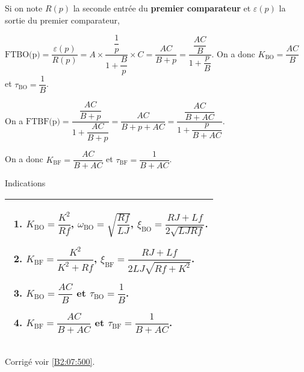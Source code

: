 \ifprof
Si on note $R(p)$ la seconde entrée du \textbf{premier comparateur} et $\varepsilon(p)$ la sortie du premier comparateur,  

$\text{FTBO(p)}=\dfrac{\varepsilon(p)}{R(p)} = A \times \dfrac{\dfrac{1}{p}}{1+\dfrac{B}{p}}\times C = \dfrac{AC}{B+p} = \dfrac{\dfrac{AC}{B}}{1+\dfrac{p}{B}}$.
On a donc $K_{\text{BO}}=\dfrac{AC}{B}$ et $\tau_{\text{BO}}=\dfrac{1}{B}$.

\else 
\fi

 
\ifprof
On a
$\text{FTBF(p)} = \dfrac{\dfrac{AC}{B+p}}{1+\dfrac{AC}{B+p}}=\dfrac{AC}{B+p+AC}=\dfrac{\dfrac{AC}{B+AC}}{1+\dfrac{p}{B+AC}}$.

On a donc $K_{\text{BF}}=\dfrac{AC}{B+AC}$ et $\tau_{\text{BF}}=\dfrac{1}{B+AC}$.

\else 
\fi




 

\ifprof
\else
\footnotesize
Indications

\begin{tabular}{|p{.9\linewidth}|}
\hline
\begin{enumerate}
\item $K_{\text{BO}}=\dfrac{K^2}{Rf}$, 
$\omega_{\text{BO}} = \sqrt{\dfrac{Rf}{LJ}}$,
$\xi_{\text{BO}} =\dfrac{RJ+Lf}{2\sqrt{LJRf}}$.
\item $K_{\text{BF}}=\dfrac{K^2}{K^2+Rf}$, 
$\xi_{\text{BF}}=\dfrac{RJ+Lf}{2LJ\sqrt{Rf+K^2}}$.
\item $K_{\text{BO}}=\dfrac{AC}{B}$ et $\tau_{\text{BO}}=\dfrac{1}{B}$.
\item $K_{\text{BF}}=\dfrac{AC}{B+AC}$ et $\tau_{\text{BF}}=\dfrac{1}{B+AC}$.
\end{enumerate} \\
\hline
\end{tabular}
\normalsize
\begin{flushright}
\footnotesize{Corrigé  voir \ref{B2:07:500}.}
\end{flushright}%
\fi